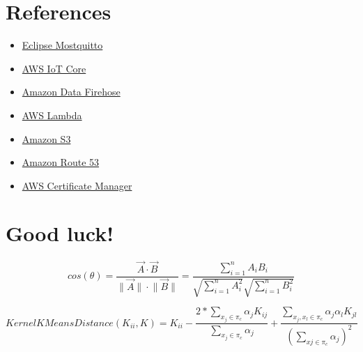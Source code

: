 \documentclass{article}
\begin{document}
\section{References}\label{references}
\begin{itemize}
  \item \href{https://mosquitto.org/}{Eclipse Mostquitto}
  \item \href{https://docs.aws.amazon.com/iot/latest/developerguide/what-is-aws-iot.html}{AWS IoT Core}
  \item \href{https://docs.aws.amazon.com/firehose/latest/dev/what-is-this-service.html}{Amazon Data Firehose}
  \item \href{https://docs.aws.amazon.com/lambda/latest/dg/welcome.html}{AWS Lambda}
  \item \href{https://docs.aws.amazon.com/AmazonS3/latest/userguide/Welcome.html}{Amazon S3}
  \item \href{https://docs.aws.amazon.com/Route53/latest/DeveloperGuide/Welcome.html}{Amazon Route 53}
  \item \href{https://docs.aws.amazon.com/acm/latest/userguide/acm-overview.html}{AWS Certificate Manager}
\end{itemize}
\section*{Good luck!}

\begin{equation}
cos(\theta) = \frac{\vec{A}\cdot\vec{B}}{\lVert \vec{A} \rVert \cdot \lVert \vec{B} \rVert} = \frac{\sum_{i=1}^{n}A_i B_i}{\sqrt{\sum_{i=1}^{n}A_i^2} \sqrt{\sum_{i=1}^{n}B_i^2}}
\end{equation}

\begin{equation}
  KernelKMeansDistance(K_{ii}, K) = K_{ii} - \frac{2 * \sum_{x_j \in \pi_{c}} \alpha_{j} K_{ij}}{\sum_{x_j \in \pi_{c}} \alpha_{j}} + \frac{\sum_{x_j,x_l \in \pi_{c}} \alpha_{j} \alpha_{l} K_{jl}}{(\sum_{x{j}\in \pi_{c}} \alpha_{j})^2}
\end{equation}
\end{document}
